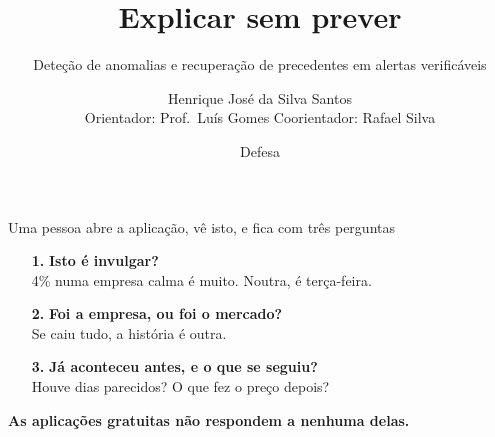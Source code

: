 \documentclass[aspectratio=169]{beamer}
\title[\gator]{Explicar sem prever}
\subtitle{\normalsize Deteção de anomalias e recuperação de precedentes em alertas verificáveis}
\author[H.\ Santos]{Henrique José da Silva Santos \\
  \footnotesize Orientador: Prof.\ Luís Gomes \quad Coorientador: Rafael Silva}
\institute[ISEP]{MEIA, Instituto Superior de Engenharia do Porto}
\date{\footnotesize Defesa}
\begin{document}
\begin{frame}\titlepage\end{frame}

\begin{frame}{Uma pessoa abre a aplicação, vê isto, e fica com três perguntas}
\begin{center}
\end{center}
\vspace{1mm}
\begin{enumerate}
  \item[\textbf{1.}] \textbf{Isto é invulgar?}\\
        \footnotesize 4\% numa empresa calma é muito. Noutra, é terça-feira.\\[2mm]
  \item[\textbf{2.}] \textbf{Foi a empresa, ou foi o mercado?}\\
        \footnotesize Se caiu tudo, a história é outra.\\[2mm]
  \item[\textbf{3.}] \textbf{Já aconteceu antes, e o que se seguiu?}\\
        \footnotesize Houve dias parecidos? O que fez o preço depois?
\end{enumerate}
\vspace{2mm}
\begin{center}
\textbf{As aplicações gratuitas não respondem a nenhuma delas.}
\end{center}
\end{frame}
\end{document}
